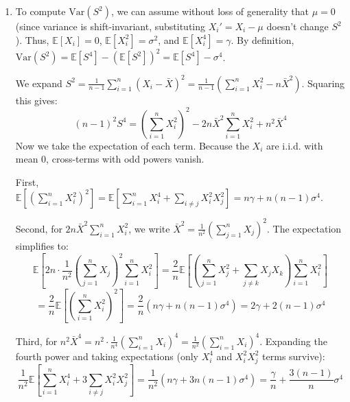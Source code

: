 \documentclass[12pt,a4paper]{article}\usepackage[]{graphicx}\usepackage[]{xcolor}
\begin{document}
\begin{enumerate}[label=\arabic*.]
\begin{enumerate}[label=(\alph*)]
        Equality fails when $\text{Var}(S) > 0$. If we draw random samples from a Normal distribution, $S^2$ follows a scaled Chi-square distribution, meaning $S$ will vary from sample to sample. Hence $\text{Var}(S) > 0$ and $\mathbb{E}[S] < \sigma$, proving $S$ is a biased estimator.

        \item To compute $\text{Var}(S^2)$, we can assume without loss of generality that $\mu = 0$ (since variance is shift-invariant, substituting $X_i' = X_i - \mu$ doesn't change $S^2$). Thus, $\mathbb{E}[X_i] = 0$, $\mathbb{E}[X_i^2] = \sigma^2$, and $\mathbb{E}[X_i^4] = \gamma$.
        By definition, $\text{Var}(S^2) = \mathbb{E}[S^4] - (\mathbb{E}[S^2])^2 = \mathbb{E}[S^4] - \sigma^4$.
        
        We expand $S^2 = \frac{1}{n-1} \sum_{i=1}^n (X_i - \bar{X})^2 = \frac{1}{n-1}\left(\sum_{i=1}^n X_i^2 - n\bar{X}^2\right)$.
        Squaring this gives:
        $$ (n-1)^2 S^4 = \left(\sum_{i=1}^n X_i^2\right)^2 - 2n\bar{X}^2 \sum_{i=1}^n X_i^2 + n^2\bar{X}^4 $$
        Now we take the expectation of each term. Because the $X_i$ are i.i.d. with mean 0, cross-terms with odd powers vanish.
        
        First, $\mathbb{E}\left[\left(\sum_{i=1}^n X_i^2\right)^2\right] = \mathbb{E}\left[\sum_{i=1}^n X_i^4 + \sum_{i \neq j} X_i^2 X_j^2\right] = n\gamma + n(n-1)\sigma^4$.
        
        Second, for $2n\bar{X}^2 \sum_{i=1}^n X_i^2$, we write $\bar{X}^2 = \frac{1}{n^2}\left(\sum_{j=1}^n X_j\right)^2$. The expectation simplifies to:
        $$ \mathbb{E}\left[2n \cdot \frac{1}{n^2} \left(\sum_{j=1}^n X_j\right)^2 \sum_{i=1}^n X_i^2\right] = \frac{2}{n} \mathbb{E}\left[\left(\sum_{j=1}^n X_j^2 + \sum_{j \neq k} X_j X_k\right) \sum_{i=1}^n X_i^2\right] $$
        $$ = \frac{2}{n} \mathbb{E}\left[\left(\sum_{i=1}^n X_i^2\right)^2\right] = \frac{2}{n} (n\gamma + n(n-1)\sigma^4) = 2\gamma + 2(n-1)\sigma^4 $$
        
        Third, for $n^2\bar{X}^4 = n^2 \cdot \frac{1}{n^4} \left(\sum_{i=1}^n X_i\right)^4 = \frac{1}{n^2}\left(\sum_{i=1}^n X_i\right)^4$. Expanding the fourth power and taking expectations (only $X_i^4$ and $X_i^2X_j^2$ terms survive):
        $$ \frac{1}{n^2}\mathbb{E}\left[\sum_{i=1}^n X_i^4 + 3\sum_{i \neq j} X_i^2 X_j^2\right] = \frac{1}{n^2}(n\gamma + 3n(n-1)\sigma^4) = \frac{\gamma}{n} + \frac{3(n-1)}{n}\sigma^4 $$
        

\end{enumerate}
\end{enumerate}
\end{document}
